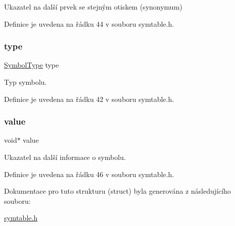 Ukazatel na další prvek se stejným otiskem (synonymum) 



Definice je uvedena na řádku 44 v souboru symtable.\+h.

\mbox{\label{struct_s___symbol_afcd0853bc59ea24aeda931b253d456a6}} 
\subsubsection{\texorpdfstring{type}{type}}
{\footnotesize\ttfamily \hyperlink{symtable_8h_a623952f6aa67a355a3840e25272b1c91}{Symbol\+Type} type}



Typ symbolu. 



Definice je uvedena na řádku 42 v souboru symtable.\+h.

\mbox{\label{struct_s___symbol_a0f61d63b009d0880a89c843bd50d8d76}} 
\subsubsection{\texorpdfstring{value}{value}}
{\footnotesize\ttfamily void$\ast$ value}



Ukazatel na další informace o symbolu. 



Definice je uvedena na řádku 46 v souboru symtable.\+h.



Dokumentace pro tuto strukturu (struct) byla generována z následujícího souboru\+:\begin{DoxyCompactItemize}
\item 
\hyperlink{symtable_8h}{symtable.\+h}\end{DoxyCompactItemize}
